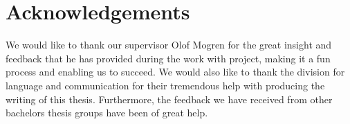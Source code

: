 \thispagestyle{plain}			%
\section*{Acknowledgements}
We would like to thank our supervisor Olof Mogren for the great insight and feedback that he has provided during the work with project, making it a fun process and enabling us to succeed. We would also like to thank the division for language and communication for their tremendous help with producing the writing of this thesis. Furthermore, the feedback we have received from other bachelors thesis groups have been of great help.

\newpage				%
\thispagestyle{empty}
\mbox{}